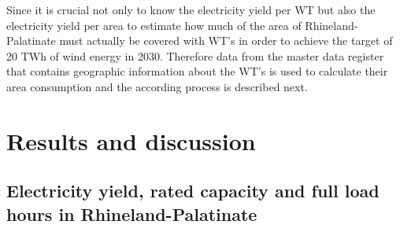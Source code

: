 \documentclass[a4paper,11pt]{article}
\begin{document}
Since it is crucial not only to know the electricity yield per WT but also the electricity yield per area to estimate how much of the area of Rhineland-Palatinate must actually be covered with WT's in order to achieve the target of 20 TWh of wind energy in 2030. Therefore data from the master data register that contains geographic information about the WT's is used to calculate their area consumption and the according process is described next.

\hypertarget{results-and-discussion}{%
\section{Results and discussion}\label{results-and-discussion}}

\hypertarget{electricity-yield-rated-capacity-and-full-load-hours-in-rhineland-palatinate}{%
\subsection{Electricity yield, rated capacity and full load hours in Rhineland-Palatinate}\label{electricity-yield-rated-capacity-and-full-load-hours-in-rhineland-palatinate}}
\end{document}
